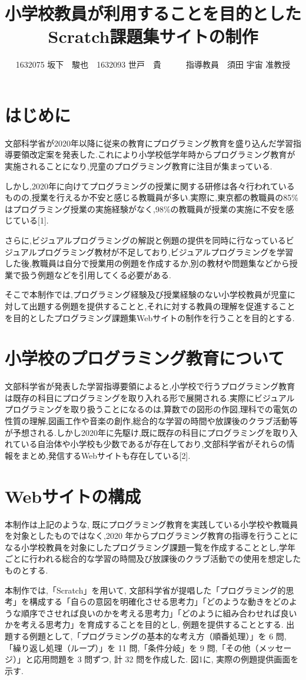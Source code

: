\documentclass[twocolumn,10pt,a4j]{jsarticle}
\title{小学校教員が利用することを目的としたScratch課題集サイトの制作}
\author{1632075 坂下　駿也　1632093 世戸　\UTF{FA1A}貴　　　指導教員　須田 宇宙 准教授}
\date{}
\begin{document}
\maketitle

\section{はじめに}

文部科学省が2020年以降に従来の教育にプログラミング教育を盛り込んだ学習指導要領改定案を発表した.これにより小学校低学年時からプログラミング教育が実施されることになり,児童のプログラミング教育に注目が集まっている.

しかし,2020年に向けてプログラミングの授業に関する研修は各々行われているものの,授業を行えるか不安と感じる教職員が多い.実際に,東京都の教職員の85\%はプログラミング授業の実施経験がなく,98\%の教職員が授業の実施に不安を感じている[1].

さらに,ビジュアルプログラミングの解説と例題の提供を同時に行なっているビジュアルプログラミング教材が不足しており,ビジュアルプログラミングを学習した後,教職員は自分で授業用の例題を作成するか,別の教材や問題集などから授業で扱う例題などを引用してくる必要がある.

そこで本制作では,プログラミング経験及び授業経験のない小学校教員が児童に対して出題する例題を提供することと,それに対する教員の理解を促進することを目的としたプログラミング課題集Webサイトの制作を行うことを目的とする.

\section{小学校のプログラミング教育について}
文部科学省が発表した学習指導要領によると,小学校で行うプログラミング教育は既存の科目にプログラミングを取り入れる形で展開される.実際にビジュアルプログラミングを取り扱うことになるのは,算数での図形の作図,理科での電気の性質の理解,図画工作や音楽の創作,総合的な学習の時間や放課後のクラブ活動等が予想される.しかし2020年に先駆け,既に既存の科目にプログラミングを取り入れている自治体や小学校も少数であるが存在しており,文部科学省がそれらの情報をまとめ,発信するWebサイトも存在している[2].

\section{Webサイトの構成}
本制作は上記のような, 既にプログラミング教育を実践している小学校や教職員を対象としたものではなく,2020 年からプログラミング教育の指導を行うことになる小学校教員を対象にしたプログラミング課題一覧を作成することとし,学年ごとに行われる総合的な学習の時間及び放課後のクラブ活動での使用を想定したものとする.\par
本制作では,「Scratch」を用いて, 文部科学省が提唱した「プログラミング的思考」を構成する「自らの意図を明確化させる思考力」「どのような動きをどのような順序でさせれば良いのかを考える思考力」「どのように組み合わせれば良いかを考える思考力」を育成することを目的とし, 例題を提供することとする. 出題する例題として,「プログラミングの基本的な考え方（順番処理）」を 6 問,「繰り返し処理（ループ）」を 11 問,「条件分岐」を 9 問,「その他（メッセージ）」と応用問題を 3 問ずつ, 計 32 問を作成した. 図1に, 実際の例題提供画面を示す.
\end{document}
